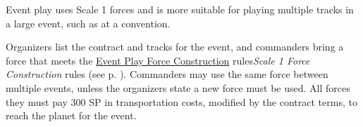 Event play uses Scale 1 forces and is more suitable for playing multiple tracks in a large event, such as at a convention.

Organizers list the contract and tracks for the event, and commanders bring a force that meets the  {\hyperref[subsec:force_construction_scale_1]{Event Play Force Construction} rules}{\emph{Scale 1 Force Construction} rules (see p. \pageref{subsec:force_construction_scale_1})}.
Commanders may use the same force between multiple events, unless the organizers state a new force must be used.
All forces they must pay 300 SP in transportation costs, modified by the contract terms, to reach the planet for the event.
